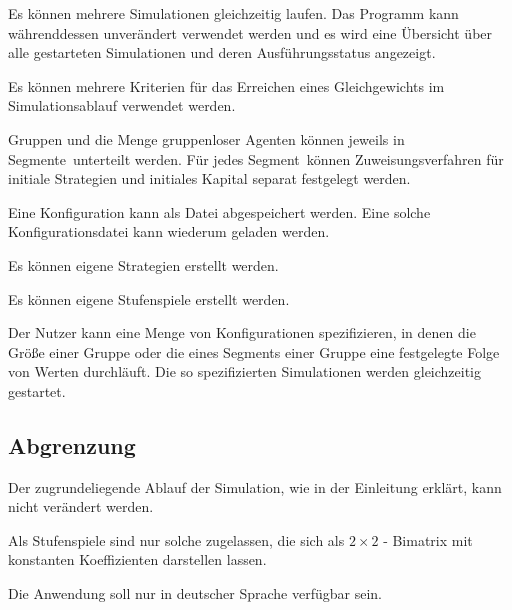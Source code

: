 \documentclass[parskip=full,11pt]{scrartcl}
\def\segment{Segment}
\def\segments{Segmente}
\begin{document}
Es können mehrere Simulationen gleichzeitig laufen. Das Programm kann währenddessen unverändert verwendet werden und es wird eine Übersicht über alle gestarteten Simulationen und deren Ausführungsstatus angezeigt.

Es können mehrere Kriterien für das Erreichen eines Gleichgewichts im Simulationsablauf verwendet werden.

Gruppen und die Menge gruppenloser Agenten können jeweils in \segments\ unterteilt werden. Für jedes \segment\ können Zuweisungsverfahren für initiale Strategien und initiales Kapital separat festgelegt werden.

Eine Konfiguration kann als Datei abgespeichert werden. Eine solche Konfigurationsdatei kann wiederum geladen werden.

Es können eigene Strategien erstellt werden.

Es können eigene Stufenspiele erstellt werden.

Der Nutzer kann eine Menge von Konfigurationen spezifizieren, in denen die Größe einer Gruppe oder die eines \segment s einer Gruppe eine festgelegte Folge von Werten durchläuft. Die so spezifizierten Simulationen werden gleichzeitig gestartet.

\subsection{Abgrenzung}

Der zugrundeliegende Ablauf der Simulation, wie in der Einleitung erklärt, kann nicht verändert werden.

Als Stufenspiele sind nur solche zugelassen, die sich als \(2 \times 2\) - Bimatrix mit konstanten Koeffizienten darstellen lassen.

Die Anwendung soll nur in deutscher Sprache verfügbar sein.

\pagebreak
\end{document}
